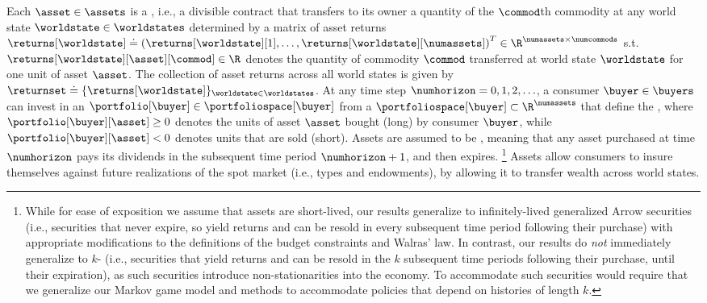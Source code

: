Each  $\asset \in \assets$ is a , i.e., a divisible contract that transfers to its owner a quantity 
of the $\commod$th commodity
at any world state $\worldstate \in \worldstates$ determined by a matrix of asset returns $\returns[\worldstate] \doteq \left(\returns[\worldstate][1], \hdots, \returns[\worldstate][\numassets] \right)^T \in \R^{\numassets \times \numcommods}$
s.t.\@ $\returns[\worldstate][\asset][\commod] \in \R$ denotes the quantity of commodity $\commod$ transferred at world state $\worldstate$ for one unit of asset $\asset$.
The collection of asset returns across all world states is given by $\returnset \doteq \{\returns[\worldstate] \}_{\worldstate \in \worldstates}$. 
At any time step $\numhorizon = 0, 1, 2, \hdots$, a consumer $\buyer \in \buyers$ can invest in an  $\portfolio[\buyer] \in \portfoliospace[\buyer]$ from a  $\portfoliospace[\buyer] \subset \R^\numassets$ that define the , where $\portfolio[\buyer][\asset] \geq 0$ denotes the units of asset $\asset$ bought (long) by consumer $\buyer$, while $\portfolio[\buyer][\asset] < 0$ denotes units that are sold (short).  
Assets are assumed to be  \cite{magill1994infinite}, meaning that any asset purchased at time $\numhorizon$ pays its dividends in the subsequent time period $\numhorizon + 1$, and then expires.%
\footnote{While for ease of exposition we assume that assets are short-lived, our results generalize to infinitely-lived generalized Arrow securities \cite{huang2004implementing} (i.e., securities that never expire, so yield returns and can be resold in every subsequent time period following their purchase) with appropriate modifications to the definitions of the budget constraints and Walras' law. 
In contrast, our results do \emph{not\/} immediately generalize to $k$- (i.e., securities that yield returns and can be resold in the $k$ subsequent time periods following their purchase, until their expiration), as such securities introduce non-stationarities into the economy. 
To accommodate such securities would require that we generalize our Markov game model and methods to accommodate policies that depend on histories of length $k$.}
Assets allow consumers to insure themselves against future realizations of 
the spot market (i.e., types and endowments), by allowing it to transfer wealth across world states.

